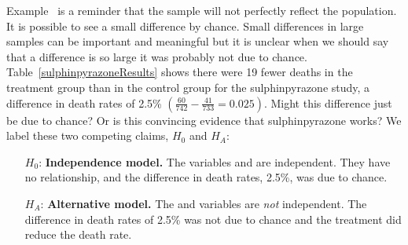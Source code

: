 
Example~ is a reminder that the sample will not perfectly reflect the population. It is possible to see a small difference by chance. Small differences in large samples can be important and meaningful but it is unclear when we should say that a difference is so large it was probably not due to chance. %
Table~\ref{sulphinpyrazoneResults} shows there were 19 fewer deaths in the treatment group than in the control group for the sulphinpyrazone study, a difference in death rates of 2.5\% $\left( \frac{60}{742} - \frac{41}{733} = 0.025 \right)$. %
Might this difference just be due to chance? Or is this convincing evidence that sulphinpyrazone works? We label these two competing claims, $H_0$ and $H_A$:
\begin{itemize}
\setlength{\itemsep}{0mm}
\item[$H_0$:] \textbf{Independence model.} The variables  and  are independent. They have no relationship, and the difference in death rates, 2.5\%, was due to chance.
\item[$H_A$:] \textbf{Alternative model.} The  and  variables are \emph{not} independent. The difference in death rates of 2.5\% was not due to chance and the treatment did reduce the death rate.
\end{itemize}

